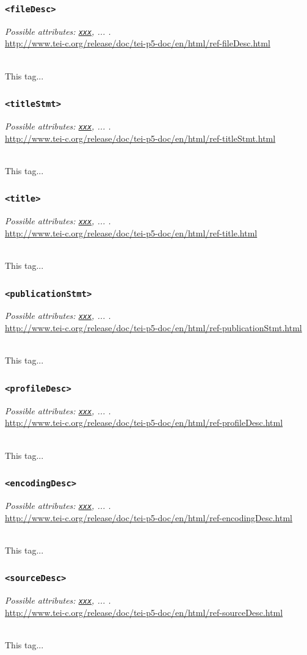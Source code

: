 \documentclass[12pt,a4paper]{article}
\newcommand{\taglinks}[2]{
\vspace*{-0.5ex}
\hspace*{\parindent}
\begin{minipage}{\textwidth}
  \emph{Possible attributes: #1.} \\ \url{#2} \end{minipage} \vspace{0.5ex} \\ }
\begin{document}
\subsubsection{\texttt{<fileDesc>}} \label{tag-sec:fileDesc}
\taglinks{
\hyperref[att-sec:xxx]{\texttt{xxx}}, ... }
{http://www.tei-c.org/release/doc/tei-p5-doc/en/html/ref-fileDesc.html}
This tag...

\subsubsection{\texttt{<titleStmt>}} \label{tag-sec:titleStmt}
\taglinks{
\hyperref[att-sec:xxx]{\texttt{xxx}}, ... }
{http://www.tei-c.org/release/doc/tei-p5-doc/en/html/ref-titleStmt.html}
This tag...

\subsubsection{\texttt{<title>}} \label{tag-sec:title}
\taglinks{
\hyperref[att-sec:xxx]{\texttt{xxx}}, ... }
{http://www.tei-c.org/release/doc/tei-p5-doc/en/html/ref-title.html}
This tag...

\subsubsection{\texttt{<publicationStmt>}} \label{tag-sec:publicationStmt}
\taglinks{
\hyperref[att-sec:xxx]{\texttt{xxx}}, ... }
{http://www.tei-c.org/release/doc/tei-p5-doc/en/html/ref-publicationStmt.html}
This tag...

\subsubsection{\texttt{<profileDesc>}} \label{tag-sec:profileDesc}
\taglinks{
\hyperref[att-sec:xxx]{\texttt{xxx}}, ... }
{http://www.tei-c.org/release/doc/tei-p5-doc/en/html/ref-profileDesc.html}
This tag...

\subsubsection{\texttt{<encodingDesc>}} \label{tag-sec:encodingDesc}
\taglinks{
\hyperref[att-sec:xxx]{\texttt{xxx}}, ... }
{http://www.tei-c.org/release/doc/tei-p5-doc/en/html/ref-encodingDesc.html}
This tag...

\subsubsection{\texttt{<sourceDesc>}} \label{tag-sec:sourcesDesc}
\taglinks{
\hyperref[att-sec:xxx]{\texttt{xxx}}, ... }
{http://www.tei-c.org/release/doc/tei-p5-doc/en/html/ref-sourceDesc.html}
This tag...
\end{document}
